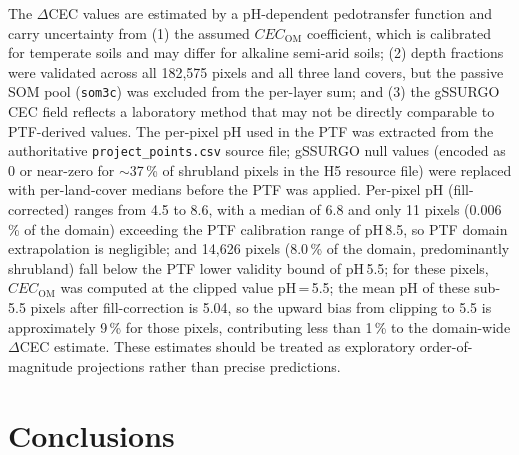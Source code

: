 \documentclass[11pt]{article}
\begin{document}
The $\Delta$CEC values are estimated by a pH-dependent pedotransfer function and carry uncertainty from (1) the assumed $\textit{CEC}_\text{OM}$ coefficient, which is calibrated for temperate soils and may differ for alkaline semi-arid soils; (2) depth fractions were validated across all 182,575 pixels and all three land covers, but the passive SOM pool (\texttt{som3c}) was excluded from the per-layer sum; and (3) the gSSURGO CEC field reflects a laboratory method that may not be directly comparable to PTF-derived values. The per-pixel pH used in the PTF was extracted from the authoritative \texttt{project\_points.csv} source file; gSSURGO null values (encoded as 0 or near-zero for $\sim$37\,\% of shrubland pixels in the H5 resource file) were replaced with per-land-cover medians before the PTF was applied. Per-pixel pH (fill-corrected) ranges from 4.5 to 8.6, with a median of 6.8 and only 11 pixels (0.006\,\% of the domain) exceeding the PTF calibration range of pH\,8.5, so PTF domain extrapolation is negligible; and 14,626 pixels (8.0\,\% of the domain, predominantly shrubland) fall below the PTF lower validity bound of pH\,5.5; for these pixels, $\textit{CEC}_\text{OM}$ was computed at the clipped value pH\,=\,5.5; the mean pH of these sub-5.5 pixels after fill-correction is 5.04, so the upward bias from clipping to 5.5 is approximately 9\,\% for those pixels, contributing less than 1\,\% to the domain-wide $\Delta$CEC estimate. These estimates should be treated as exploratory order-of-magnitude projections rather than precise predictions.

\section*{Conclusions}
\end{document}
